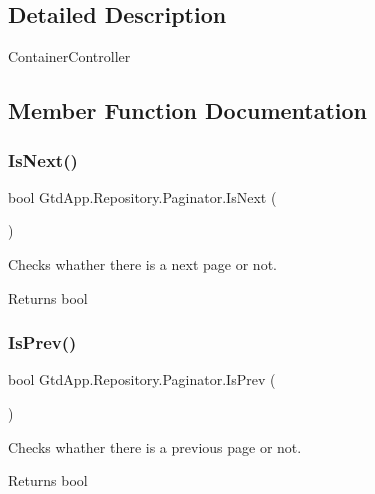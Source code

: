 \subsection{Detailed Description}
Container\+Controller 



\subsection{Member Function Documentation}
\mbox{\label{class_gtd_app_1_1_repository_1_1_paginator_a16f01f9dcbe513466fb415b8cd3ca094}} 
\subsubsection{Is\+Next()}
{\footnotesize\ttfamily bool Gtd\+App.\+Repository.\+Paginator.\+Is\+Next (\begin{DoxyParamCaption}{ }\end{DoxyParamCaption})}



Checks whather there is a next page or not. 

\begin{DoxyReturn}{Returns}
bool
\end{DoxyReturn}
\mbox{\label{class_gtd_app_1_1_repository_1_1_paginator_a4ae54d0e48b7228d90a599b3e2450229}} 
\subsubsection{Is\+Prev()}
{\footnotesize\ttfamily bool Gtd\+App.\+Repository.\+Paginator.\+Is\+Prev (\begin{DoxyParamCaption}{ }\end{DoxyParamCaption})}



Checks whather there is a previous page or not. 

\begin{DoxyReturn}{Returns}
bool
\end{DoxyReturn}
\mbox{\label{class_gtd_app_1_1_repository_1_1_paginator_a86e79209fe0fc10c09b0022acd393093}} 
